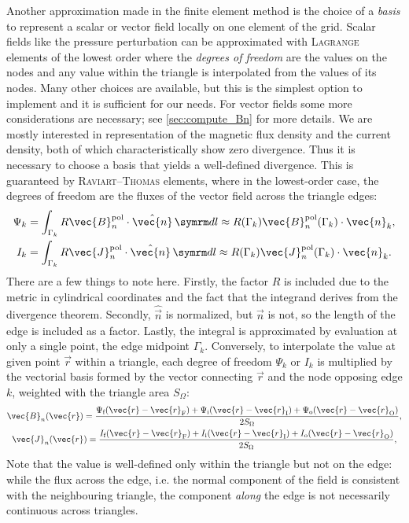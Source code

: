Another approximation made in the finite element method is the choice of a \emph{basis} to represent a scalar or vector field locally on one element of the grid. Scalar fields like the pressure perturbation can be approximated with \textsc{Lagrange} elements of the lowest order where the \emph{degrees of freedom} are the values on the nodes and any value within the triangle is interpolated from the values of its nodes. Many other choices are available, but this is the simplest option to implement and it is sufficient for our needs. For vector fields some more considerations are necessary; see \cref{sec:compute_Bn} for more details. We are mostly interested in representation of the magnetic flux density and the current density, both of which characteristically show zero divergence. Thus it is necessary to choose a basis that yields a well-defined divergence. This is guaranteed by \textsc{Raviart}--\textsc{Thomas} elements, where in the lowest-order case, the degrees of freedom are the fluxes of the vector field across the triangle edges:
\begin{gather}
  \Psi_{k} = \int_{\Gamma_{k}} R \vec{B}_{n}^{\pol} \cdot \hat{\vec{n}} \, \diff l \approx R (\Gamma_{k}) \vec{B}_{n}^{\pol} (\Gamma_{k}) \cdot \vec{n}_{k}, \label{eq:Psi_k} \\
  I_{k} = \int_{\Gamma_{k}} R \vec{J}_{n}^{\pol} \cdot \hat{\vec{n}} \, \diff l \approx R (\Gamma_{k}) \vec{J}_{n}^{\pol} (\Gamma_{k}) \cdot \vec{n}_{k}. \label{eq:I_k}
\end{gather}
There are a few things to note here. Firstly, the factor $R$ is included due to the metric in cylindrical coordinates and the fact that the integrand derives from the divergence theorem. Secondly, $\hat{\vec{n}}$ is normalized, but $\vec{n}$ is not, so the length of the edge is included as a factor. Lastly, the integral is approximated by evaluation at only a single point, the edge midpoint $\Gamma_{k}$. Conversely, to interpolate the value at given point $\vec{r}$ within a triangle, each degree of freedom $\Psi_{k}$ or $I_{k}$ is multiplied by the vectorial basis formed by the vector connecting $\vec{r}$ and the node opposing edge $k$, weighted with the triangle area $S_{\Omega}$:
\begin{gather}
  \vec{B}_{n} (\vec{r}) = \frac{\Psi_{\fs} (\vec{r} - \vec{r}_{\vfs}) + \Psi_{\inw} (\vec{r} - \vec{r}_{\vinw}) + \Psi_{\out} (\vec{r} - \vec{r}_{\vout})}{2 S_{\Omega}}, \\
  \vec{J}_{n} (\vec{r}) = \frac{I_{\fs} (\vec{r} - \vec{r}_{\vfs}) + I_{\inw} (\vec{r} - \vec{r}_{\vinw}) + I_{\out} (\vec{r} - \vec{r}_{\vout})}{2 S_{\Omega}},
\end{gather}
Note that the value is well-defined only within the triangle but not on the edge: while the flux across the edge, i.e. the normal component of the field is consistent with the neighbouring triangle, the component \emph{along} the edge is not necessarily continuous across triangles.

